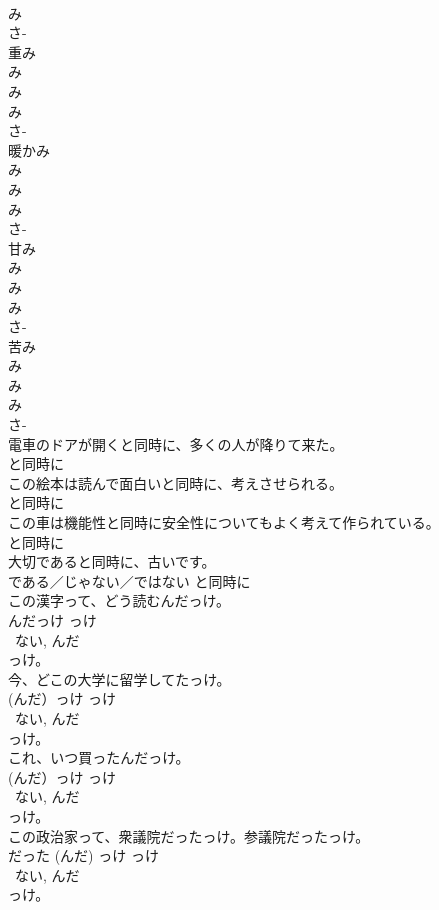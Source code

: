 \documentclass[8pt]{extreport}
\begin{document}
\begin{CJK}{UTF8}{min}
{\\	み 
\\	さ-
\\	重み	
\\	み 
\\	み 
\\	み 
\\	さ-
\\	暖かみ	
\\	み 
\\	み 
\\	み 
\\	さ-
\\	甘み	
\\	み 
\\	み 
\\	み 
\\	さ-
\\	苦み	
\\	み 
\\	み 
\\	み 
\\	さ-
\\	電車のドアが開くと同時に、多くの人が降りて来た。	
\\	と同時に 
\\	この絵本は読んで面白いと同時に、考えさせられる。	
\\	と同時に 
\\	この車は機能性と同時に安全性についてもよく考えて作られている。	
\\	と同時に 
\\	大切であると同時に、古いです。	
\\	{である／じゃない／ではない} と同時に 
\\	この漢字って、どう読むんだっけ。	
\\	んだっけ っけ 
\\	~ない, んだ 
\\	っけ。
\\	今、どこの大学に留学してたっけ。	
\\	(んだ）っけ っけ 
\\	~ない, んだ 
\\	っけ。
\\	これ、いつ買ったんだっけ。	
\\	(んだ）っけ っけ 
\\	~ない, んだ 
\\	っけ。
\\	この政治家って、衆議院だったっけ。参議院だったっけ。	
\\	だった (んだ) っけ っけ 
\\	~ない, んだ 
\\	っけ。
}
\end{CJK}
\end{document}

